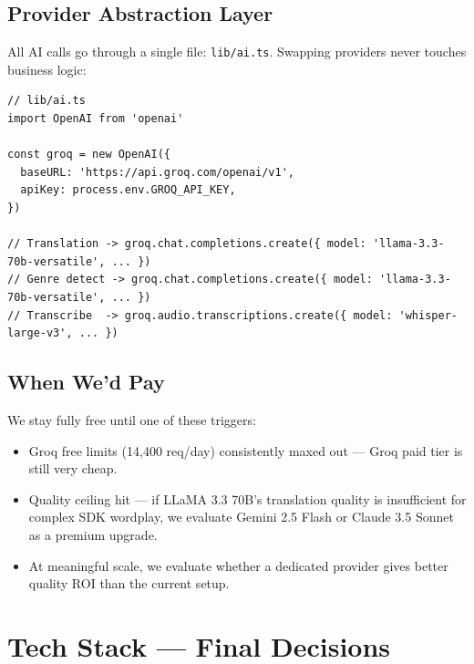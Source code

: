 \documentclass[12pt, a4paper]{article}
\begin{document}
\subsection{Provider Abstraction Layer}

All AI calls go through a single file: \texttt{lib/ai.ts}.
Swapping providers never touches business logic:

\begin{tcolorbox}[codebox]
\begin{lstlisting}
// lib/ai.ts
import OpenAI from 'openai'

const groq = new OpenAI({
  baseURL: 'https://api.groq.com/openai/v1',
  apiKey: process.env.GROQ_API_KEY,
})

// Translation -> groq.chat.completions.create({ model: 'llama-3.3-70b-versatile', ... })
// Genre detect -> groq.chat.completions.create({ model: 'llama-3.3-70b-versatile', ... })
// Transcribe  -> groq.audio.transcriptions.create({ model: 'whisper-large-v3', ... })
\end{lstlisting}
\end{tcolorbox}

\subsection{When We'd Pay}

We stay fully free until one of these triggers:
\begin{itemize}
  \item Groq free limits (14,400 req/day) consistently maxed out ---
        Groq paid tier is still very cheap.
  \item Quality ceiling hit --- if LLaMA 3.3 70B's translation quality
        is insufficient for complex SDK wordplay, we evaluate Gemini 2.5 Flash
        or Claude 3.5 Sonnet as a premium upgrade.
  \item At meaningful scale, we evaluate whether a dedicated provider
        gives better quality ROI than the current setup.
\end{itemize}

\section{Tech Stack — Final Decisions}
\end{document}
